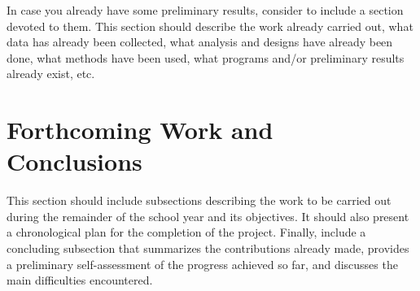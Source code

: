 \documentclass[sigplan]{acmart}
\begin{document}
In case you already have some preliminary results, consider to include a section devoted to them. This section should  describe the work already carried out, what data has already been collected, what analysis and designs have already been done, what methods have been used, what programs and/or preliminary results already exist, etc.

\section{Forthcoming Work and Conclusions} \label{sec:conclusions}

This section should include subsections describing the work to be carried out during the remainder of the school year and its objectives. 
%
It should also present a chronological plan for the completion of the project. 
%
Finally, include a concluding subsection that summarizes the contributions already made, provides a preliminary self-assessment of the progress achieved so far, and discusses the main difficulties encountered.





\end{document}
